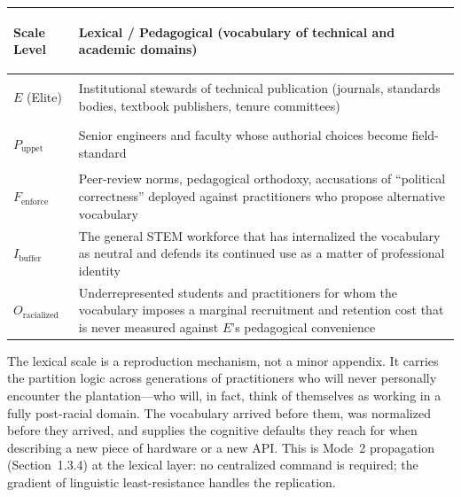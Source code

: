 \begin{center}
\begin{tabular}{>{\bfseries\raggedright}p{3.0cm} p{10.5cm}}
\toprule
\textbf{Scale Level} & \textbf{Lexical / Pedagogical (vocabulary of technical and academic domains)} \\
\midrule
$E$ (Elite) & Institutional stewards of technical publication (journals, standards bodies, textbook publishers, tenure committees) \\
$P_{\text{uppet}}$ & Senior engineers and faculty whose authorial choices become field-standard \\
$F_{\text{enforce}}$ & Peer-review norms, pedagogical orthodoxy, accusations of ``political correctness'' deployed against practitioners who propose alternative vocabulary \\
$I_{\text{buffer}}$ & The general STEM workforce that has internalized the vocabulary as neutral and defends its continued use as a matter of professional identity \\
$O_{\text{racialized}}$ & Underrepresented students and practitioners for whom the vocabulary imposes a marginal recruitment and retention cost that is never measured against $E$'s pedagogical convenience \\
\bottomrule
\end{tabular}
\end{center}

The lexical scale is a reproduction mechanism, not a minor appendix. It carries the partition logic across generations of practitioners who will never personally encounter the plantation---who will, in fact, think of themselves as working in a fully post-racial domain. The vocabulary arrived before them, was normalized before they arrived, and supplies the cognitive defaults they reach for when describing a new piece of hardware or a new API. This is Mode~2 propagation (Section~1.3.4) at the lexical layer: no centralized command is required; the gradient of linguistic least-resistance handles the replication.

